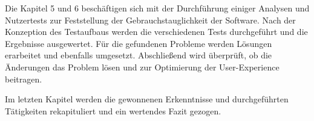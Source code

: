 Die Kapitel 5 und 6 beschäftigen sich mit der Durchführung einiger Analysen und Nutzertests zur Feststellung der Gebrauchstauglichkeit der Software. Nach der Konzeption des Testaufbaus werden die verschiedenen Tests durchgeführt und die Ergebnisse ausgewertet. Für die gefundenen Probleme werden Lösungen erarbeitet und ebenfalls umgesetzt. Abschließend wird überprüft, ob die Änderungen das Problem lösen und zur Optimierung der User-Experience beitragen.\par
Im letzten Kapitel werden die gewonnenen Erkenntnisse und durchgeführten Tätigkeiten rekapituliert und ein wertendes Fazit gezogen.\par %